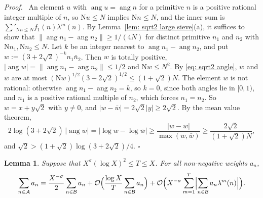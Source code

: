 \documentclass{article}
\numberwithin{equation}{section}
\newtheorem{lemma}{Lemma}
\newenvironment{proof}[1][Proof]{\par\medskip\noindent\textit{#1.}\ }{\hfill$\square$\par\medskip}
\newcommand{\Le}{\leqslant}
\newcommand{\Ge}{\geqslant}
\begin{document}
\begin{proof}
An element $u$ with $\operatorname{ang} u = \operatorname{ang} n$ for a primitive $n$ is a positive rational integer multiple of $n$, so $\mathrm{N}u \Le N$ implies $\mathrm{N}n \Le N$, and the inner sum is $\sum'_{\mathrm{N}n \Le N} f_1(n) \lambda^m(n)$. By Lemma~\ref{lem: sqrt2 large sieve}(a), it suffices to show that $\|\operatorname{ang} n_1 - \operatorname{ang} n_2\| \Ge 1/(4N)$ for distinct primitive $n_1$ and $n_2$ with $\mathrm{N}n_1, \mathrm{N}n_2 \Le N$. Let $k$ be an integer nearest to $\operatorname{ang} n_1 - \operatorname{ang} n_2$, and put $w := (3 + 2\sqrt{2})^{-k} n_1 \bar n_2$. Then $w$ is totally positive, $|\operatorname{ang} w| = \|\operatorname{ang} n_1 - \operatorname{ang} n_2\| \Le 1/2$ and $\mathrm{N}w \Le N^2$. By \eqref{eq: sqrt2 angle}, $w$ and $\bar w$ are at most $(\mathrm{N}w)^{1/2}(3 + 2\sqrt{2})^{1/2} \Le (1 + \sqrt{2})N$. The element $w$ is not rational: otherwise $\operatorname{ang} n_1 - \operatorname{ang} n_2 = k$, so $k = 0$, since both angles lie in $[0, 1)$, and $n_1$ is a positive rational multiple of $n_2$, which forces $n_1 = n_2$. So $w = x + y\sqrt{2}$ with $y \neq 0$, and $|w - \bar w| = 2\sqrt{2}|y| \Ge 2\sqrt{2}$. By the mean value theorem,
\begin{equation*}
2\log(3 + 2\sqrt{2})\, |\operatorname{ang} w| = |\log w - \log \bar w| \Ge \frac{|w - \bar w|}{\max(w, \bar w)} \Ge \frac{2\sqrt{2}}{(1 + \sqrt{2})N},
\end{equation*}
and $\sqrt{2} > (1 + \sqrt{2})\log(3 + 2\sqrt{2})/4$.
\end{proof}

\begin{lemma}
\label{lem: sqrt2 sector}
Suppose that $X^{\sigma} (\log X)^2 \Le T \Le X$. For all non-negative weights $a_n$,
\begin{equation*}
\sum_{n \in \mathcal{A}} a_n = \frac{X^{-\sigma}}{2} \sum_{n \in \mathcal{B}} a_n + \mathcal{O}\Bigl( \frac{\log X}{T} \sum_{n \in \mathcal{B}} a_n \Bigr) + \mathcal{O}\Bigl( X^{-\sigma} \sum_{m = 1}^{T} \Bigl| \sum_{n \in \mathcal{B}} a_n \lambda^m(n) \Bigr| \Bigr).
\end{equation*}
\end{lemma}
\end{document}
